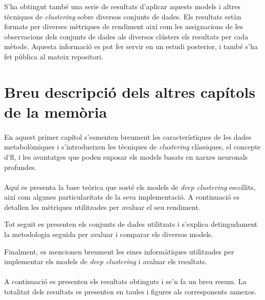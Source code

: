 \documentclass[CAT,BIB]{TFUOC}%
\begin{document}
        S'ha obtingut també una serie de resultats
        d'aplicar aquests models i altres tècniques de \textit{clustering}
        sobre diversos conjunts de dades.
        Els resultats estàn formats per diverses mètriques de rendiment
        així com les assignacions de les observacions dels conjunts de dades
        als diversos clústers els resultats per cada mètode.
        Aquesta informació es pot fer servir en un estudi posterior,
        i també s'ha fet pública al mateix repositori.

    \section{Breu descripció dels altres capítols de la memòria}

    \paragraph{ }
        En aquest primer capítol
        s'esmenten breument les característiques de les dades metabolòmiques
        i s'introdueixen les tècniques de \textit{clustering} clàssiques,
        el concepte d'\gls{fl},
        i les avantatges que poden suposar els models basats en xarxes neuronals profundes.

    \paragraph{ }
        Aquí es presenta la base teòrica que sosté
        els models de \textit{deep clustering} escollits,
        així com algunes particularitats de la seva implementació.
        A continuació es detallen les mètriques
        utilitzades per avaluar el seu rendiment.

        Tot seguit
        es presenten els conjunts de dades utilitzats
        i s'explica detingudament la metodologia seguida
        per avaluar i comparar els diversos models.

        Finalment,
        es mencionen breument les eines informàtiques utilitzades
        per implementar els models de \textit{deep clustering}
        i avaluar els resultats.

    \paragraph{ }
        A continuació
        es presenten els resultats obtinguts
        i se'n fa un breu resum.
        La totalitat dels resultats
        es presenten en taules i figures als corresponents annexos.
\end{document}

